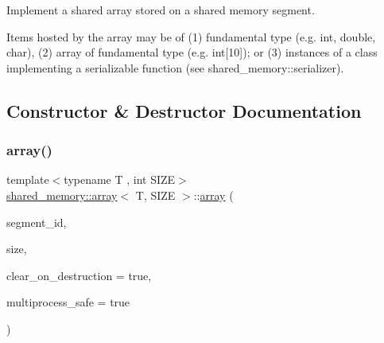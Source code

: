 Implement a shared array stored on a shared memory segment. 

Items hosted by the array may be of (1) fundamental type (e.\+g. int, double, char), (2) array of fundamental type (e.\+g. int\mbox{[}10\mbox{]}); or (3) instances of a class implementing a serializable function (see shared\+\_\+memory\+::serializer). 

\subsection{Constructor \& Destructor Documentation}
\mbox{\label{classshared__memory_1_1array_a95b5abd158cb04ab0644f5aa6df48b2b}} 
\subsubsection{\texorpdfstring{array()}{array()}\hspace{0.1cm}{\footnotesize\ttfamily [1/2]}}
{\footnotesize\ttfamily template$<$typename T , int S\+I\+ZE$>$ \\
\hyperlink{classshared__memory_1_1array}{shared\+\_\+memory\+::array}$<$ T, S\+I\+ZE $>$\+::\hyperlink{classshared__memory_1_1array}{array} (\begin{DoxyParamCaption}\item[{std\+::string}]{segment\+\_\+id,  }\item[{std\+::size\+\_\+t}]{size,  }\item[{bool}]{clear\+\_\+on\+\_\+destruction = {\ttfamily true},  }\item[{bool}]{multiprocess\+\_\+safe = {\ttfamily true} }\end{DoxyParamCaption})}


